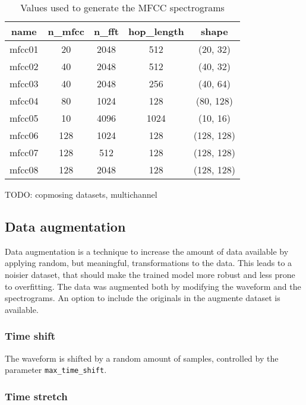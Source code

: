 \begin{table}[t!]
    \centering
    \caption{Values used to generate the MFCC spectrograms}
    \label{tab:mfcc_values}
    \begin{tabular}{|c|cccc|}
        \hline
        name & n\_mfcc & n\_fft & hop\_length & shape \\
        \hline
        mfcc01 & 20  & 2048 & 512  & (20, 32) \\
        mfcc02 & 40  & 2048 & 512  & (40, 32) \\
        mfcc03 & 40  & 2048 & 256  & (40, 64) \\
        mfcc04 & 80  & 1024 & 128  & (80, 128) \\
        mfcc05 & 10  & 4096 & 1024 & (10, 16) \\
        mfcc06 & 128 & 1024 & 128  & (128, 128) \\
        mfcc07 & 128 & 512  & 128  & (128, 128) \\
        mfcc08 & 128 & 2048 & 128  & (128, 128) \\
        \hline
    \end{tabular}
\end{table}

TODO: copmosing datasets, multichannel

\subsection{Data augmentation}

Data augmentation is a technique to increase the amount of data available by
applying random, but meaningful, transformations to the data. This leads to a
noisier dataset, that should make the trained model more robust and less prone
to overfitting. The data was augmented both by modifying the waveform and the
spectrograms. An option to include the originals in the augmente dataset is
available.

\subsubsection{Time shift}

The waveform is shifted by a random amount of samples, controlled by the
parameter \texttt{max\_time\_shift}.

\subsubsection{Time stretch}

